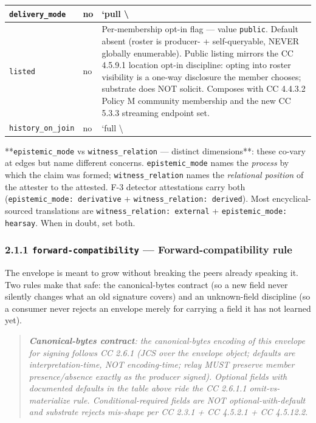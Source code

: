 \documentclass[11pt]{article}
\begin{document}
{\begin{longtable}{|p{5.33cm}|p{5.33cm}|p{5.33cm}|}
\texttt{delivery\_mode} & no & `pull \textbackslash{} \\ \hline
\texttt{listed} & no & Per-membership opt-in flag — value \texttt{public}. Default absent (roster is producer- + self-queryable, NEVER globally enumerable). Public listing mirrors the CC 4.5.9.1 location opt-in discipline: opting into roster visibility is a one-way disclosure the member chooses; substrate does NOT solicit. Composes with CC 4.4.3.2 Policy M community membership and the new CC 5.3.3 streaming endpoint set. \\ \hline
\texttt{history\_on\_join} & no & `full \textbackslash{} \\ \hline
\end{longtable}}


**\texttt{epistemic\_mode} vs \texttt{witness\_relation} — distinct dimensions**: these co-vary at edges but name different concerns. \texttt{epistemic\_mode} names the \textit{process} by which the claim was formed; \texttt{witness\_relation} names the \textit{relational position} of the attester to the attested. F-3 detector attestations carry both (\texttt{epistemic\_mode: derivative} + \texttt{witness\_relation: derived}). Most encyclical-sourced translations are \texttt{witness\_relation: external} + \texttt{epistemic\_mode: hearsay}. When in doubt, set both.


\subsubsection*{2.1.1 \texttt{forward-compatibility} — Forward-compatibility rule}


The envelope is meant to grow without breaking the peers already speaking it. Two rules make that safe: the canonical-bytes contract (so a new field never silently changes what an old signature covers) and an unknown-field discipline (so a consumer never rejects an envelope merely for carrying a field it has not learned yet).


\begin{quote}\itshape \textbf{Canonical-bytes contract}: the canonical-bytes encoding of this envelope for signing follows CC 2.6.1 (JCS over the envelope object; defaults are interpretation-time, NOT encoding-time; relay MUST preserve member presence/absence exactly as the producer signed). Optional fields with documented defaults in the table above ride the CC 2.6.1.1 omit-vs-materialize rule. Conditional-required fields are NOT optional-with-default and substrate rejects mis-shape per CC 2.3.1 + CC 4.5.2.1 + CC 4.5.12.2.\end{quote}
\end{document}
